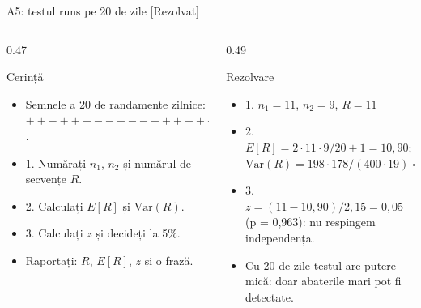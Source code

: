 \begin{frame}{A5: testul runs pe 20 de zile [Rezolvat]}
\itemsize{\scriptsize}
\begin{columns}[T]
\begin{column}{0.47\textwidth}
\begin{block}{Cerință}
\begin{itemize}
    \item Semnele a 20 de randamente zilnice: $+ + - + + + - - + - - - + + - + - - + +$.
    \item 1. Numărați $n_1$, $n_2$ și numărul de secvențe $R$.
    \item 2. Calculați $E[R]$ și $\mathrm{Var}(R)$.
    \item 3. Calculați $z$ și decideți la 5\%.
    \item Raportați: $R$, $E[R]$, $z$ și o frază.
\end{itemize}
\end{block}
\end{column}
\begin{column}{0.49\textwidth}
\begin{exampleblock}{Rezolvare}
\begin{itemize}
    \item 1. $n_1 = 11$, $n_2 = 9$, $R = 11$
    \item 2. $E[R] = 2 \cdot 11 \cdot 9/20 + 1 = 10{,}90$; $\mathrm{Var}(R) = 198 \cdot 178/(400 \cdot 19) = 4{,}64$
    \item 3. $z = (11 - 10{,}90)/2{,}15 = 0{,}05$ (p = 0{,}963): nu respingem independența.
    \item Cu 20 de zile testul are putere mică: doar abaterile mari pot fi detectate.
\end{itemize}
\end{exampleblock}
\end{column}
\end{columns}
\end{frame}

